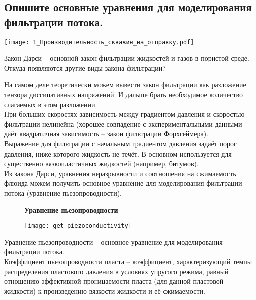 

\subsection{Опишите основные уравнения для моделирования фильтрации потока.}

\texttt{[image: 1\_Производительность\_скважин\_на\_отправку.pdf]}

Закон Дарси -- основной закон фильтрации жидкостей и газов в пористой среде.
\\

Откуда появляются другие виды закона фильтрации?

На самом деле теоретически можем вывести закон фильтрации как разложение тензора диссипативных напряжений.
И дальше брать необходимое количество слагаемых в этом разложении.
\\

При больших скоростях зависимость между градиентом давления и скоростью фильтрации нелинейна (хорошее совпадение с экспериментальными данными даёт квадратичная зависимость -- закон фильтрации Форхгеймера).
\\

Выражение для фильтрации с начальным градиентом давления задаёт порог давления, ниже которого жидкость не течёт.
В основном используется для существенно вязкопластичных жидкостей (например, битумов).
\\

Из закона Дарси, уравнения неразрывности и соотношения на сжимаемость флюида можем получить основное уравнение для моделирования фильтрации потока (уравнение пьезопроводности).

\begin{figure}[H]
\textbf{Уравнение пьезопроводности}

\texttt{[image: get\_piezoconductivity]}
\end{figure}

Уравнение пьезопроводности -- основное уравнение для моделирования фильтрации потока.
\\

Коэффициент пьезопроводности пласта -- коэффициент, характеризующий темпы распределения пластового давления в условиях упругого режима, равный отношению эффективной проницаемости пласта (для данной пластовой жидкости) к произведению вязкости жидкости и её сжимаемости.

